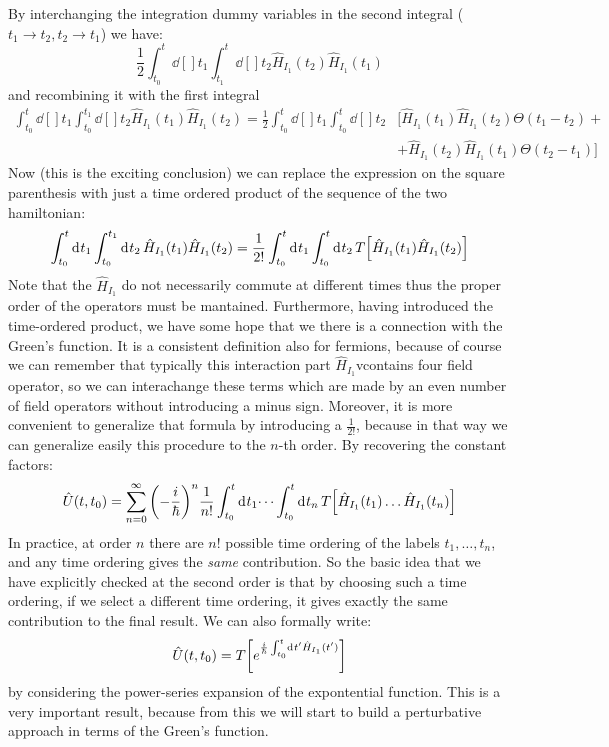 \documentclass[../main/main.tex]{subfiles}
\begin{document}
By interchanging the integration dummy variables in the second integral (\( t_1 \rightarrow t_2, t_2 \rightarrow t_1 \)) we have:
\begin{equation*}
  \frac{1}{2}   \int_{t_0}^{t} \dd[]{t_1} \int_{t_1}^{t} \dd[]{t_2} \hat{H}_{I_1}(t_2) \hat{H}_{I_1} (t_1)
\end{equation*}
and recombining it with the first integral
\begin{equation*}
\begin{split}
  \int_{t_0}^{t} \dd[]{t_1} \int_{t_0}^{t_1} \dd[]{t_2}  \hat{H}_{I_1} (t_1) \hat{H}_{I_1} (t_2) =
  \frac{1}{2} \int_{t_0}^{t} \dd[]{t_1} \int_{t_0}^{t} \dd[]{t_2}
  & \Big[ \hat{H}_{I_1} (t_1) \hat{H}_{I_1} (t_2) \Theta (t_1 - t_2) + \\
  &+ \hat{H}_{I_1} (t_2) \hat{H}_{I_1} (t_1) \Theta (t_2 - t_1)  \Big]
\end{split}
\end{equation*}
Now (this is the exciting conclusion) we can replace the expression on the square parenthesis with just a time ordered product of the sequence of the two hamiltonian:
\begin{equation}
    \int_{t_0}^{t} \dd[]{t_1} \int_{t_0}^{t_1} \dd[]{t_2}  \hat{H}_{I_1} (t_1) \hat{H}_{I_1} (t_2)
    = \frac{1}{2!} \int_{t_0}^{t} \dd[]{t_1} \int_{t_0}^{t} \dd[]{t_2}
    T \qty[ \hat{H}_{I_1} (t_1) \hat{H}_{I_1} (t_2)  ]
\end{equation}
Note that the \( \hat{H}_{I_1}  \) do not necessarily commute at different times thus the proper order of the operators must be mantained. Furthermore, having introduced the time-ordered product, we have some hope that we there is a connection with the Green's function.
It is a consistent definition also for fermions, because of course we can remember that typically this interaction part \( \hat{H}_{I_1}  \)vcontains four field operator, so we can interachange these terms which are made by an even number of field operators without introducing a minus sign.
Moreover, it is more convenient to generalize that formula by introducing a \( \frac{1}{2!} \), because in that way we can generalize easily this procedure to the \( n \)-th order. By recovering the constant factors:
\begin{equation}
  \hat{U} (t,t_0) = \sum_{n=0}^{\infty } \qty(-\frac{i}{\hbar })^n \frac{1}{n!}
  \int_{t_0}^{t} \dd[]{t_1} \dots \int_{t_0}^{t} \dd[]{t_n}
  T \qty[ \hat{H}_{I_1} (t_1) \dots \hat{H}_{I_1} (t_n)  ]
\end{equation}
In practice, at order \( n \) there are \( n! \) possible time ordering of the labels \( t_1, \dots, t_n \), and any time ordering gives the \emph{same}  contribution.
So the basic idea that we have explicitly checked at the second order is that by choosing such a time ordering, if we select a different time ordering, it gives exactly the same contribution to the final result.
We can also formally write:
\begin{equation}
  \hat{U} (t,t_0) = T \qty[ e^{\frac{i}{\hbar }\int_{t_0}^{t} \dd[]{t'} \hat{H}_{I_1} (t')   } ]
\end{equation}
by considering the power-series expansion of the expontential function.
This is a very important result, because from this we will start to build a perturbative approach in terms of the Green's function.
\end{document}
